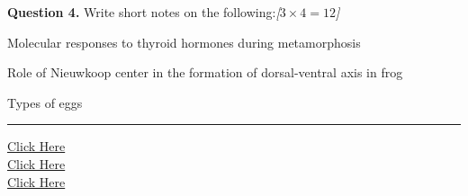 \documentclass[11pt,a4paper]{article}
\newcommand{\pts}[1]{\hfill   \textit{[#1]}}
\begin{document}
\medskip


\noindent   \textbf{Question 4.} Write short notes on the following:\pts{$3  \times 4 = 12$}

\begin{parts}
  \item Molecular responses to thyroid hormones during metamorphosis
  \item Role of Nieuwkoop center in the formation of dorsal-ventral axis in frog
  \item Types of eggs
\end{parts}

\vfill
\rule{\linewidth}{0.4pt}

\begin{center}\small
\href{https://bhu-exam.vercel.app/}{Click Here}\\[4pt]\href{https://me-aryan.vercel.app/}{Click Here}\\[4pt]\href{https://quashan-me.vercel.app/}{Click Here}
\end{center}
\end{document}
